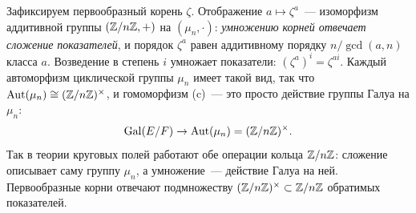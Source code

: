 \begin{remark}
Зафиксируем первообразный корень $\zeta$. Отображение $a\mapsto\zeta^a$~--- изоморфизм аддитивной группы $(\mathbb Z/n\mathbb Z,+)$ на
$(\mu_n,\cdot)$: \emph{умножению корней отвечает сложение показателей}, и порядок $\zeta^a$ равен аддитивному порядку
$n/\gcd(a,n)$ класса $a$. Возведение в степень $i$ умножает показатели: $(\zeta^a)^i=\zeta^{ai}$. Каждый автоморфизм
циклической группы $\mu_n$ имеет такой вид, так что $\operatorname{Aut}(\mu_n)\cong(\mathbb Z/n\mathbb Z)^\times$, и гомоморфизм (c)~---
это просто действие группы Галуа на $\mu_n$:
\[
\operatorname{Gal}(E/F)\to\operatorname{Aut}(\mu_n)=(\mathbb Z/n\mathbb Z)^\times .
\]
Так в теории круговых полей работают обе операции кольца $\mathbb Z/n\mathbb Z$: сложение описывает саму группу $\mu_n$, а умножение~---
действие Галуа на ней. Первообразные корни отвечают подмножеству $(\mathbb Z/n\mathbb Z)^\times\subset\mathbb Z/n\mathbb Z$ обратимых показателей.
\end{remark}

